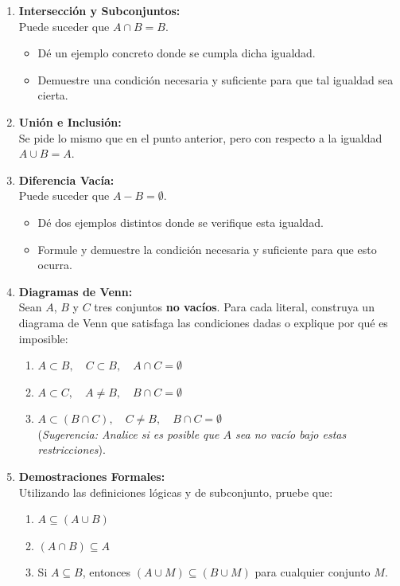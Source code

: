 \begin{enumerate}
    \item \textbf{Intersección y Subconjuntos:} \\
    Puede suceder que $A \cap B = B$. 
    \begin{itemize}
        \item Dé un ejemplo concreto donde se cumpla dicha igualdad.
        \item Demuestre una condición necesaria y suficiente para que tal igualdad sea cierta.
    \end{itemize}

    \item \textbf{Unión e Inclusión:} \\
    Se pide lo mismo que en el punto anterior, pero con respecto a la igualdad $A \cup B = A$.

    \item \textbf{Diferencia Vacía:} \\
    Puede suceder que $A - B = \emptyset$.
    \begin{itemize}
        \item Dé dos ejemplos distintos donde se verifique esta igualdad.
        \item Formule y demuestre la condición necesaria y suficiente para que esto ocurra.
    \end{itemize}

    \item \textbf{Diagramas de Venn:} \\
    Sean $A$, $B$ y $C$ tres conjuntos \textbf{no vacíos}. Para cada literal, construya un diagrama de Venn que satisfaga las condiciones dadas o explique por qué es imposible:
    \begin{enumerate}
        \item $A\subset B, \quad C \subset B, \quad A \cap C = \emptyset$
        \item $A\subset C, \quad A \neq B, \quad B \cap C = \emptyset$
        \item $A\subset(B\cap C), \quad C\neq B, \quad B\cap C = \emptyset$ \\ 
        (\textit{Sugerencia: Analice si es posible que $A$ sea no vacío bajo estas restricciones}).
    \end{enumerate}

    \item \textbf{Demostraciones Formales:} \\
    Utilizando las definiciones lógicas y de subconjunto, pruebe que:
    \begin{enumerate}
        \item $A \subseteq (A\cup B)$
        \item $(A\cap B) \subseteq A$
        \item Si $A\subseteq B$, entonces $(A\cup M) \subseteq (B\cup M)$ para cualquier conjunto $M$.
    \end{enumerate}


\end{enumerate}
